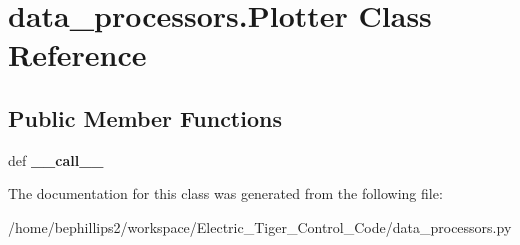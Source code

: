 \hypertarget{classdata__processors_1_1_plotter}{\section{data\-\_\-processors.\-Plotter Class Reference}
\label{classdata__processors_1_1_plotter}
}
\subsection*{Public Member Functions}
\begin{DoxyCompactItemize}
\item 
\hypertarget{classdata__processors_1_1_plotter_a27acd3242a67c8140c1c99c2a1b8d9e8}{def {\bfseries \-\_\-\-\_\-call\-\_\-\-\_\-}}\label{classdata__processors_1_1_plotter_a27acd3242a67c8140c1c99c2a1b8d9e8}

\end{DoxyCompactItemize}


The documentation for this class was generated from the following file\-:\begin{DoxyCompactItemize}
\item 
/home/bephillips2/workspace/\-Electric\-\_\-\-Tiger\-\_\-\-Control\-\_\-\-Code/data\-\_\-processors.\-py\end{DoxyCompactItemize}
